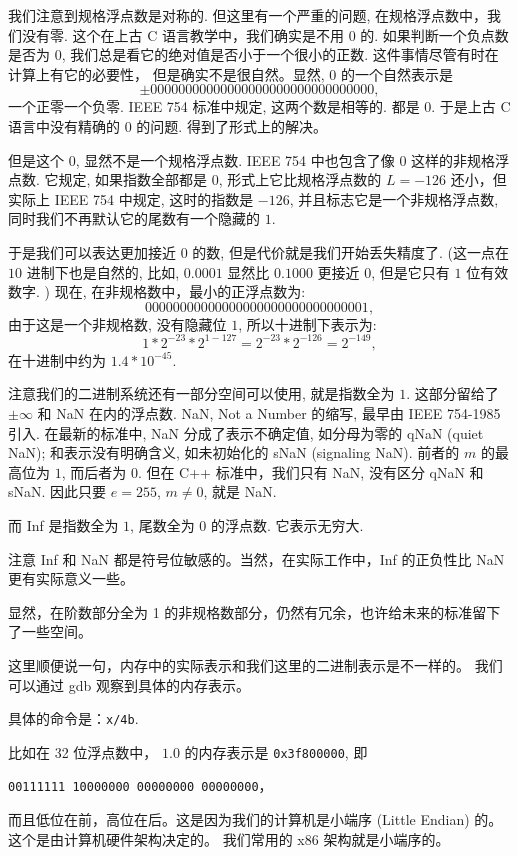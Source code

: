 \documentclass[a4paper]{ctexart}
\begin{document}
{我们注意到规格浮点数是对称的. 但这里有一个严重的问题, 在规格浮点数中，我们没有零. 
这个在上古 C 语言教学中，我们确实是不用 $0$ 的. 如果判断一个负点数是否为 $0$, 
我们总是看它的绝对值是否小于一个很小的正数. 这件事情尽管有时在计算上有它的必要性，
但是确实不是很自然。显然, $0$ 
的一个自然表示是
$$
\pm 0 00000000 00000000000000000000000,
$$
一个正零一个负零. IEEE 754 标准中规定, 这两个数是相等的. 都是 $0$.
于是上古 C 语言中没有精确的 $0$ 的问题. 得到了形式上的解决。

但是这个 $0$, 显然不是一个规格浮点数. 
IEEE 754 中也包含了像 $0$ 这样的非规格浮点数. 它规定, 如果指数全部都是 $0$, 
形式上它比规格浮点数的 $L = -126$ 还小，但实际上 IEEE 754 中规定, 这时的指数是 $-126$,
并且标志它是一个非规格浮点数, 同时我们不再默认它的尾数有一个隐藏的 $1$.

于是我们可以表达更加接近 $0$ 的数, 但是代价就是我们开始丢失精度了. (这一点在 $10$ 
进制下也是自然的, 比如, $0.0001$ 显然比 $0.1000$ 更接近 $0$, 但是它只有 $1$ 
位有效数字. ) 
现在, 在非规格数中，最小的正浮点数为:
$$
0 00000000 00000000000000000000001,
$$
由于这是一个非规格数, 没有隐藏位 $1$, 
所以十进制下表示为:
$$
1 * 2^{-23} * 2^{1-127} = 2^{-23} * 2^{-126} = 2^{-149},
$$
在十进制中约为 $1.4 * 10^{-45}$.
 
注意我们的二进制系统还有一部分空间可以使用, 就是指数全为 $1$.
这部分留给了$\pm \infty$ 和 NaN 在内的浮点数.
NaN, Not a Number 的缩写, 最早由 IEEE 754-1985 引入. 在最新的标准中,
NaN 分成了表示不确定值, 如分母为零的 qNaN (quiet NaN); 和表示没有明确含义,
如未初始化的 sNaN (signaling NaN). 前者的 $m$ 的最高位为 $1$,
而后者为 $0$. 但在 C++ 标准中，我们只有 NaN, 没有区分 qNaN 和 sNaN. 
因此只要 $e = 255$, $m \neq 0$, 就是 NaN. 

而 Inf 是指数全为 $1$, 尾数全为 $0$ 的浮点数. 它表示无穷大. 

注意 Inf 和 NaN 都是符号位敏感的。当然，在实际工作中，Inf 的正负性比 NaN 更有实际意义一些。

显然，在阶数部分全为 1 的非规格数部分，仍然有冗余，也许给未来的标准留下了一些空间。

这里顺便说一句，内存中的实际表示和我们这里的二进制表示是不一样的。
我们可以通过 gdb 观察到具体的内存表示。

具体的命令是：\verb|x/4b|. 

比如在 32 位浮点数中，
$1.0$ 的内存表示是 \verb|0x3f800000|, 即 

\verb|00111111 10000000 00000000 00000000|，

而且低位在前，高位在后。这是因为我们的计算机是小端序 (Little Endian) 的。这个是由计算机硬件架构决定的。
我们常用的 x86 架构就是小端序的。

}
\end{document}
